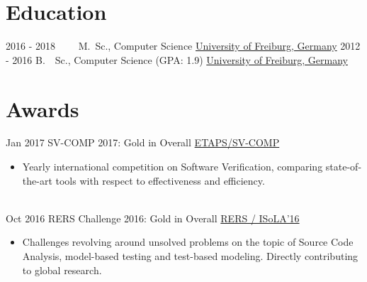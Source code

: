 \documentclass[letterpaper]{twentysecondcv} %
\begin{document}
\section{Education}

\begin{twenty} %
	\twentyitem
    	{2016 - 2018~~~~}
        {}
        {M.~Sc., Computer Science}
        {\href{https://www.uni-freiburg.de/}{University of Freiburg, Germany}}
        {}
        {}
	\twentyitem
    	{2012 - 2016}
		{}
        {B.~~Sc., Computer Science \textnormal{(GPA: 1.9)}}
        {\href{https://www.uni-freiburg.de/}{University of Freiburg, Germany}}
        {}
        {}
\end{twenty}


\section{Awards}
\begin{twenty} %
	\twentyitem
    		{Jan 2017}
		{}
        		{SV-COMP 2017: Gold in Overall}
        		{\href{https://sv-comp.sosy-lab.org/2017/}{ETAPS/SV-COMP}}
        		{}
        		{\begin{itemize}
        			\item Yearly international competition on Software Verification, comparing state-of-the-art tools
        				with respect to effectiveness and efficiency.
        		\end{itemize}}\\
        	\twentyitem
    		{Oct 2016}
		{}
        		{RERS Challenge 2016: Gold in Overall}
        		{\href{http://rers-challenge.org/2016/}{RERS / ISoLA'16}}
        		{}
        		{\begin{itemize}
        			\item Challenges revolving around unsolved problems on the topic of Source Code Analysis,
        				model-based testing and test-based modeling. Directly contributing to global research.
        		\end{itemize}}
\end{twenty}
\end{document}
